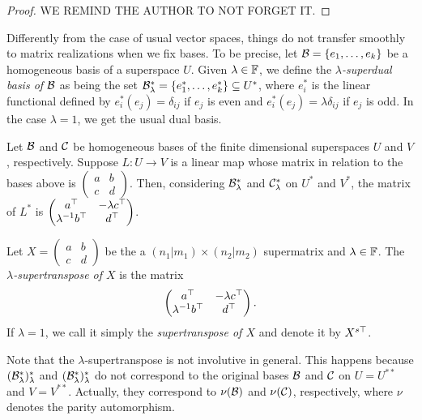 \documentclass{amsbook}
\begin{document}
\begin{proof}
    WE REMIND THE AUTHOR TO NOT FORGET IT.
\end{proof}

Differently from the case of usual vector spaces, things do not transfer smoothly to matrix realizations when we fix bases. To be precise, let $\mathcal B = \{e_1, \ldots, e_k\}$ be a homogeneous basis of a superspace $U$. Given $\lambda \in \mathbb{F}$, we define the \emph{$\lambda$-superdual basis of $\mathcal B$} as being the set $\mathcal B^*_\lambda = \{e_1^*, \ldots, e_k^*\} \subseteq U^*$, where $e_i^*$ is the linear functional defined by $e_i^*(e_j) = \delta_{ij}$ if $e_j$ is even and $e_i^*(e_j) = \lambda \delta_{ij}$ if $e_j$ is odd. In the case $\lambda = 1$, we get the usual dual basis.

Let $\mathcal B$ and $\mathcal C$ be homogeneous bases of the finite dimensional superspaces $U$ and $V$, respectively. Suppose $L: U \to V$ is a linear map whose matrix in relation to the bases above is
$\begin{pmatrix}
        a & b\\
        c & d
    \end{pmatrix}$.
Then, considering $\mathcal B^*_\lambda$ and $\mathcal C^*_\lambda$ on $U^*$ and $V^*$, the matrix of $L^*$ is
$\begin{pmatrix}
        a^{\top} & -\lambda c^{\top}\\
        \lambda^{-1} b^{\top} & d^{\top}
    \end{pmatrix}$.
    
\begin{defi}
    Let $X = \begin{pmatrix}
        a & b\\
        c & d
    \end{pmatrix}$ be the a $(n_1 | m_1)\times (n_2 | m_2)$ supermatrix and $\lambda \in \mathbb{F}$. The \emph{$\lambda$-supertranspose of $X$} is the matrix
    \[
    \begin{pmatrix}
        a^{\top} & -\lambda c^{\top}\\
        \lambda^{-1} b^{\top} & d^{\top}
    \end{pmatrix}. 
    \]
    If $\lambda = 1$, we call it simply the \emph{supertranspose of $X$} and denote it by $X^{s\top}$.
\end{defi}

Note that the $\lambda$-supertranspose is not involutive in general. This happens because $(\mathcal B^*_\lambda)^*_\lambda$ and $(\mathcal B^*_\lambda)^*_\lambda$ do not correspond to the original bases $\mathcal B$ and $\mathcal C$ on $U = U^{**}$ and $V=V^{**}$. Actually, they correspond to $\nu (\mathcal B)$ and $\nu (\mathcal C)$, respectively, where $\nu$ denotes the parity automorphism.
\end{document}
